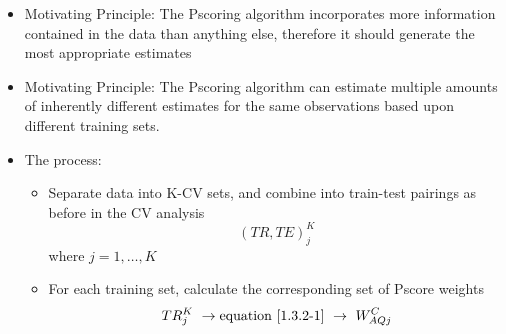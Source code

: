 \documentclass[12pt,]{article}
\providecommand{\tightlist}{%
  \setlength{\itemsep}{0pt}\setlength{\parskip}{0pt}}
\begin{document}
\begin{itemize}
\tightlist
\item
  Motivating Principle: The Pscoring algorithm incorporates more
  information contained in the data than anything else, therefore it
  should generate the most appropriate estimates
\item
  Motivating Principle: The Pscoring algorithm can estimate multiple
  amounts of inherently different estimates for the same observations
  based upon different training sets.
\item
  The process:

  \begin{itemize}
  \tightlist
  \item
    Separate data into K-CV sets, and combine into train-test pairings
    as before in the CV analysis \[(TR, TE)_{j}^{K}\] where
    \(j =1, \ldots, K\)
  \item
    For each training set, calculate the corresponding set of Pscore
    weights
    \[TR_{j}^{K} \ \rightarrow \text{equation} \ \eqref{1.3.2-1} \ \rightarrow \  W_{AQj}^{C}\]


\end{itemize}
\end{itemize}
\end{document}
